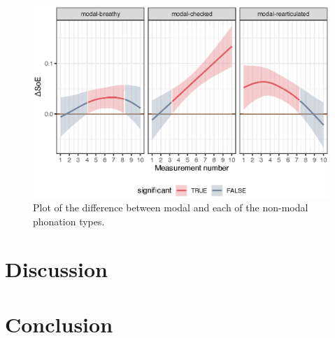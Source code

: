 \begin{figure}[h!]
    \centering
    \includegraphics[]{images/LCH_GAMMs/soe_model_diff.eps}
    \caption{Plot of the difference between modal and each of the non-modal phonation types.}
    \label{fig:soe_model_diff}
\end{figure}


\section{Discussion}\label{sec:discussion_of_lc}

\citet{humbertConsonantTypesVowel1978} 


\section{Conclusion}\label{sec:conclusion_of_lc}
